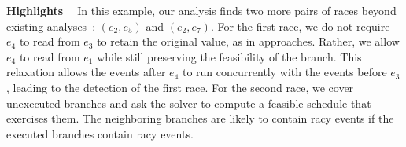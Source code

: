 {\bf Highlights \ } In this example, our analysis finds two more pairs of races beyond existing analyses~\cite{yannis, jeff}: $(e_2, e_5)$ and $(e_2, e_7)$.
For the first race, we do not require $e_4$ to read from $e_3$ to retain the original value, as in approaches. Rather, we allow $e_4$ to read from $e_1$ while still preserving the feasibility of the branch. This relaxation allows the events after $e_4$ to run concurrently with the events before $e_3$, leading to the detection of the first race.  For the second race, we cover unexecuted branches and ask the solver to compute a feasible schedule that exercises them. The neighboring branches are likely to contain racy events if the executed branches contain racy events.

 

